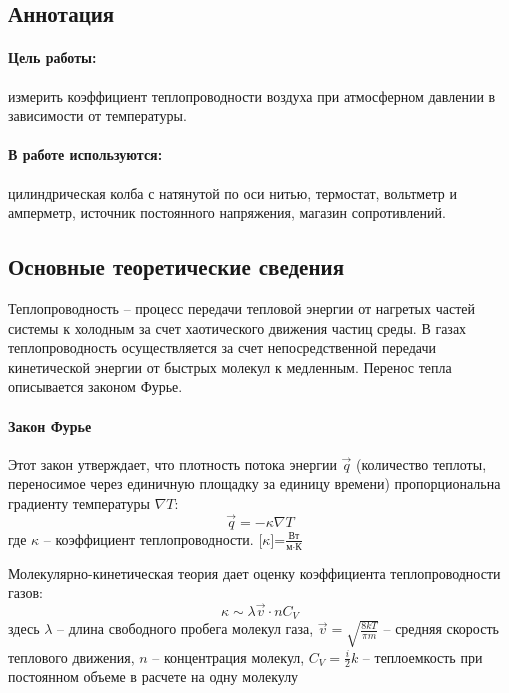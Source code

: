 \documentclass[a4paper,12pt]{report}
\begin{document}
	
	\newpage
    
    \subsection*{Аннотация}
        \paragraph*{Цель работы:} измерить коэффициент теплопроводности воздуха при атмосферном давлении в зависимости от температуры.
        \paragraph*{В работе используются:} цилиндрическая колба с натянутой по оси нитью, термостат, вольтметр и амперметр, источник постоянного напряжения, магазин сопротивлений.
    \subsection*{Основные теоретические сведения}
    Теплопроводность -- процесс передачи тепловой энергии от нагретых частей системы к холодным за счет хаотического движения частиц среды. В газах теплопроводность осуществляется за счет непосредственной передачи кинетической энергии от быстрых молекул к медленным. Перенос тепла описывается законом Фурье.
    \paragraph*{Закон Фурье}
    Этот закон утверждает, что плотность потока энергии $\vec{q}$ (количество теплоты, переносимое через единичную площадку за единицу времени) пропорциональна градиенту температуры $\nabla T$:
    \begin{equation}
        \label{fourier}
        \vec{q}=-\kappa \nabla T
    \end{equation}
    где $\kappa$ -- коэффициент теплопроводности. [$\kappa$]=$\frac{\text{Вт}}{\text{м}\cdot\text{К}}$

    Молекулярно-кинетическая теория дает оценку коэффициента теплопроводности газов:
    \begin{equation}
        \label{kappa approx}
        \kappa \sim \lambda \vec{v} \cdot n C_V
    \end{equation}
    здесь $\lambda$ -- длина свободного пробега молекул газа, $\vec{v}=\sqrt{\frac{8kT}{\pi m}}$ -- средняя скорость теплового движения, $n$ -- концентрация молекул, $C_V=\frac{i}{2}k$ -- теплоемкость при постоянном объеме в расчете на одну молекулу
\end{document}
